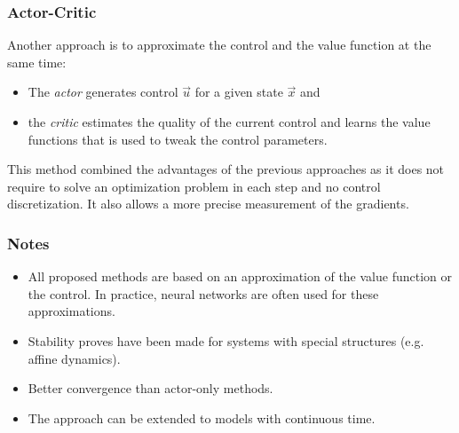 			\subsubsection{Actor-Critic}
				Another approach is to approximate the control and the value function at the same time:
				\begin{itemize}
					\item The \emph{actor} generates control \(\vec{u}\) for a given state \(\vec{x}\) and
					\item the \emph{critic} estimates the quality of the current control and learns the value functions that is used to tweak the control parameters.
				\end{itemize}
				This method combined the advantages of the previous approaches as it does not require to solve an optimization problem in each step and no control discretization. It also allows a more precise measurement of the gradients.

			\subsubsection{Notes}
				\begin{itemize}
					\item All proposed methods are based on an approximation of the value function or the control. In practice, neural networks are often used for these approximations.
					\item Stability proves have been made for systems with special structures (e.g. affine dynamics).
					\item Better convergence than actor-only methods.
					\item The approach can be extended to models with continuous time.
				\end{itemize}
